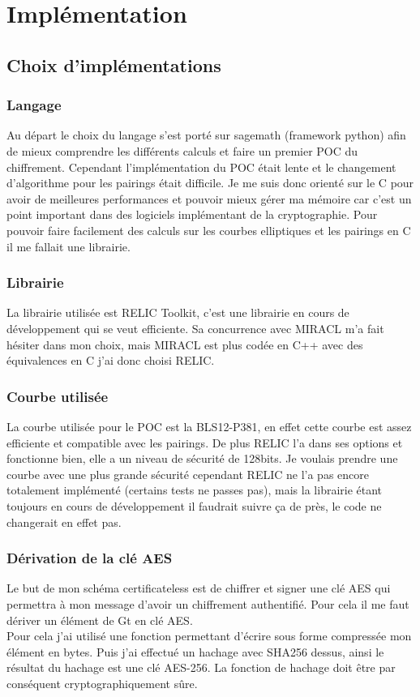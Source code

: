 \chapter{Implémentation}
\label{ch:impl}

\section{Choix d'implémentations}
\subsection{Langage}
Au départ le choix du langage s'est porté sur sagemath (framework python) afin de mieux comprendre les différents calculs et faire un premier POC du chiffrement.
Cependant l'implémentation du POC était lente et le changement d'algorithme pour les pairings était difficile.
Je me suis donc orienté sur le C pour avoir de meilleures performances et pouvoir mieux gérer ma mémoire car c'est un point important dans des logiciels implémentant de la cryptographie. Pour pouvoir faire facilement des calculs sur les courbes elliptiques et les pairings en C il me fallait une librairie.
\subsection{Librairie}
La librairie utilisée est RELIC Toolkit\cite{relic-toolkit}, c'est une librairie en cours de développement qui se veut efficiente. Sa concurrence avec MIRACL m'a fait hésiter dans mon choix, mais MIRACL est plus codée en C++ avec des équivalences en C j'ai donc choisi RELIC.
\subsection{Courbe utilisée}
La courbe utilisée pour le POC est la BLS12-P381, en effet cette courbe est assez efficiente et compatible avec les pairings. De plus RELIC l'a dans ses options et fonctionne bien, elle a un niveau de sécurité de 128bits. Je voulais prendre une courbe avec une plus grande sécurité cependant RELIC ne l'a pas encore totalement implémenté (certains tests ne passes pas), mais la librairie étant toujours en cours de développement il faudrait suivre ça de près, le code ne changerait en effet pas.
\subsection{Dérivation de la clé AES}
Le but de mon schéma certificateless est de chiffrer et signer une clé AES qui permettra à mon message d'avoir un chiffrement authentifié. Pour cela il me faut dériver un élément de Gt en clé AES.\\
Pour cela j'ai utilisé une fonction permettant d'écrire sous forme compressée mon élément en bytes. Puis j'ai effectué un hachage avec SHA256 dessus, ainsi le résultat du hachage est une clé AES-256. La fonction de hachage doit être par conséquent cryptographiquement sûre.
